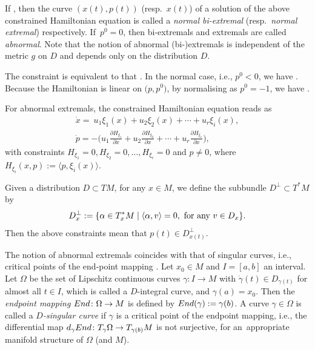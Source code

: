 \documentclass[11pt]{article}
\numberwithin{equation}{section}
\numberwithin{equation}{section}
\theoremstyle{definition}
\newcommand{\0}{\boldsymbol{0}}
\newcommand{\pa}{\partial}
\begin{document}
If , then
the curve $(x(t), p(t))$ (resp.\ $x(t)$)
of a solution of the above constrained Hamiltonian equation
is called a {\it normal bi-extremal}
(resp.\ {\it normal extremal}) respectively.
If~${p^0 = 0}$, then bi-extremals and extremals are called {\it abnormal}.
Note that the notion of abnormal \mbox{(bi-)extremals} is independent of the metric $g$ on $D$ and
depends only on the distribution $D$.

The constraint
\smash{$\frac{\pa H}{\pa u_j} = 0$} is equivalent to that
.
In the normal case, i.e., $p^0 < 0$, we have
. Because the Hamiltonian
is linear on $\bigl(p, p^0\bigr)$, by normalising as $p^0 = -1$, we have
.

For abnormal extremals, the constrained Hamiltonian equation reads as
\begin{gather*}
\dot{x} = \ u_1\xi_1(x) + u_2\xi_2(x) + \cdots + u_r\xi_i(x),
\\
\dot{p} = - \biggl(u_1\frac{\pa H_{\xi_1}}{\pa x} + u_2\frac{\pa H_{\xi_2}}{\pa x} + \cdots +
u_r\frac{\pa H_{\xi_r}}{\pa x}\biggr),
\end{gather*}
with constraints
$H_{\xi_1} = 0, H_{\xi_2} = 0, \dots, H_{\xi_r} = 0$ and $p \not= 0$,
where $H_{\xi_i}(x, p) := \langle p, \xi_i(x)\rangle$.

Given a distribution $D \subset TM$, for any $x \in M$, we define the subbundle $D^\perp \subset T^*M$ by
\[
D^\perp_x := \{ \alpha \in T^*_xM \mid \langle \alpha, v\rangle = 0, {\mbox{\rm\ for any\ }} v \in D_x\}.
\]
Then the above constraints mean that $p(t) \in D^\perp_{x(t)}$.

The notion of abnormal extremals coincides with that of singular curves, i.e.,
critical points of the end-point mapping \cite{Montgomery0, Montgomery}.
Let $x_0 \in M$ and $I = [a, b]$ an interval. Let
$\Omega$ be the set of Lipschitz continuous curves $\gamma\colon I \to M$ with
$\dot{\gamma}(t) \in D_{\gamma(t)}$ for almost all $t \in I$, which is called a $D$-integral curve,
and $\gamma(a) = x_0$.
Then the {\it endpoint mapping}
${\rm End}\colon \Omega \to M$
is defined by ${\rm End}(\gamma) := \gamma(b)$.
A curve $\gamma \in \Omega$ is called a {\it $D$-singular curve} if $\gamma$ is
a critical point of the endpoint mapping,
i.e., the differential map
${\rm d}_{\gamma}{\rm End}\colon T_{\gamma}\Omega \to T_{\gamma(b)}M$
is not surjective, for an~appropriate manifold structure of $\Omega$ (and $M$).
\end{document}
